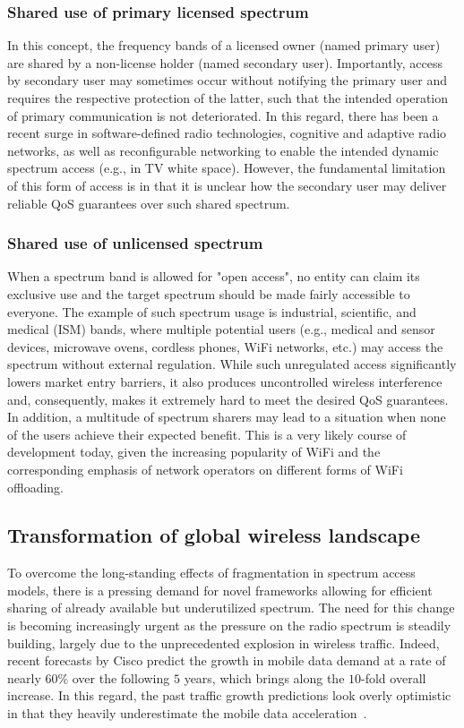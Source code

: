 \documentclass[journal]{IEEEtran}
\begin{document}
\subsubsection{Shared use of primary licensed spectrum} In this concept, the frequency bands of a licensed owner (named primary user) are shared by a non-license holder (named secondary user). Importantly, access by secondary user may sometimes occur without notifying the primary user and requires the respective protection of the latter, such that the intended operation of primary communication is not deteriorated. In this regard, there has been a recent surge in software-defined radio technologies, cognitive and adaptive radio networks, as well as reconfigurable networking to enable the intended dynamic spectrum access (e.g., in TV white space). However, the fundamental limitation of this form of access is in that it is unclear how the secondary user may deliver reliable QoS guarantees over such shared spectrum.

\subsubsection{Shared use of unlicensed spectrum} When a spectrum band is allowed for "open access", no entity can claim its exclusive use and the target spectrum should be made fairly accessible to everyone. The example of such spectrum usage is industrial, scientific, and medical (ISM) bands, where multiple potential users (e.g., medical and sensor devices, microwave ovens, cordless phones, WiFi networks, etc.) may access the spectrum without external regulation. While such unregulated access significantly lowers market entry barriers, it also produces uncontrolled wireless interference and, consequently, makes it extremely hard to meet the desired QoS guarantees. In addition, a multitude of spectrum sharers may lead to a situation when none of the users achieve their expected benefit. This is a very likely course of development today, given the increasing popularity of WiFi and the corresponding emphasis of network operators on different forms of WiFi offloading.

\subsection{Transformation of global wireless landscape}

To overcome the long-standing effects of fragmentation in spectrum access models, there is a pressing demand for novel frameworks allowing for efficient sharing of already available but underutilized spectrum. The need for this change is becoming increasingly urgent as the pressure on the radio spectrum is steadily building, largely due to the unprecedented explosion in wireless traffic. Indeed, recent forecasts by Cisco predict the growth in mobile data demand at a rate of nearly 60\% over the following $5$ years, which brings along the $10$-fold overall increase. In this regard, the past traffic growth predictions look overly optimistic in that they heavily underestimate the mobile data acceleration~\cite{Mue14}.
\end{document}
